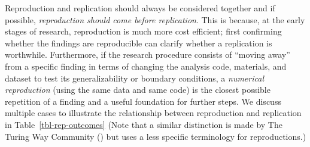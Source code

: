 \documentclass[
  letterpaper,
  DIV=11,
  openany,
  fontsize=12pt,
  parskip=half,
  headings=big,
  numbers=noenddot,
  titlepage=false]{scrreprt}
\begin{document}
Reproduction and replication should always be considered together and if
possible, \emph{reproduction should come before replication}. This is
because, at the early stages of research, reproduction is much more cost
efficient; first confirming whether the findings are reproducible can
clarify whether a replication is worthwhile. Furthermore, if the
research procedure consists of ``moving away'' from a specific finding
in terms of changing the analysis code, materials, and dataset to test
its generalizability or boundary conditions, a \emph{numerical
reproduction} (using the same data and same code) is the closest
possible repetition of a finding and a useful foundation for further
steps. We discuss multiple cases to illustrate the relationship between
reproduction and replication in Table~\ref{tbl-rep-outcomes} (Note that
a similar distinction is made by The Turing Way Community
() but uses a less specific
terminology for reproductions.)
\end{document}
